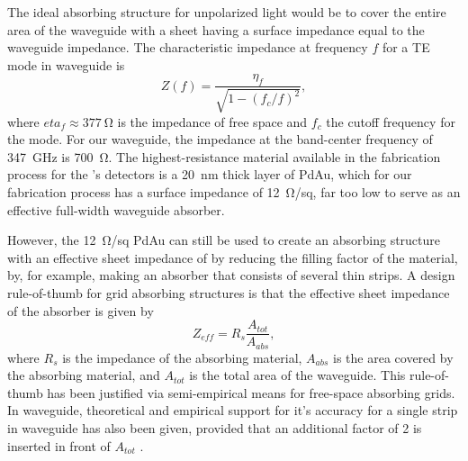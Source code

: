 The ideal absorbing structure for unpolarized light would be to cover the entire area of the waveguide with a sheet having a surface impedance equal to the waveguide impedance.
The characteristic impedance at frequency $f$ for a TE mode in waveguide is \cite[Chapter~2]{harrington_time-harmonic_2001}
\begin{equation} \label{eqn:ch4-wg-imp}
  Z (f) = \frac{\eta_f}{\sqrt{1 - (f_c/f)^2}},
\end{equation}
where $eta_f \approx \SI{377}{\ohm}$ is the impedance of free space and $f_c$ the cutoff frequency for the mode.
For our waveguide, the impedance at the band-center frequency of \SI{347}{\GHz} is \SI{700}{\ohm}.
The highest-resistance material available in the fabrication process for the \Imager's detectors is a \SI{20}{\nm} thick layer of PdAu, which for our fabrication process has a surface impedance of \SI{12}{\ohm}/sq, far too low to serve as an effective full-width waveguide absorber.

However, the \SI{12}{\ohm}/sq PdAu can still be used to create an absorbing structure with an effective sheet impedance of  by reducing the filling factor of the material, by, for example, making an absorber that consists of several thin strips.
A design rule-of-thumb for grid absorbing structures is that the effective sheet impedance of the absorber is given by 
\begin{equation} \label{eqn:ch4-imp-fill-factor}
  Z_{eff} = R_s \frac{A_{tot}}{A_{abs}},
\end{equation}
where $R_s$ is the impedance of the absorbing material, $A_{abs}$ is the area covered by the absorbing material, and $A_{tot}$ is the total area of the waveguide.
This rule-of-thumb has been justified via semi-empirical means \cite{ulrich_far-infrared_1967,whitbourn_equivalent-circuit_1985} for free-space absorbing grids.
In waveguide, theoretical and empirical support for it's accuracy for a single strip in waveguide has also been given, provided that an additional factor of 2 is inserted in front of $A_{tot}$ \cite{datesman_analytical_2011}.

